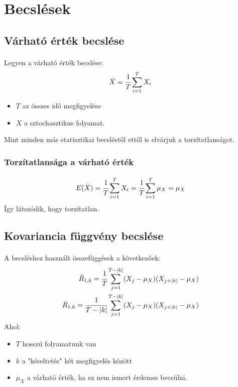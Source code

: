 \documentclass[11pt,a4paper]{article}
\begin{document}
		\section{Becslések}
			\subsection{Várható érték becslése}
				\paragraph{}
					Legyen a várható érték becslése:
					$$\bar{X} = \cfrac{1}{T} \sum_{i = 1}^{T}X_i$$
					\begin{itemize}
						\item $T$ az összes idő megfigyelése
						\item $X$ a sztochasztikus folyamat.
					\end{itemize}
					Mint minden más statisztikai becsléstől ettől is elvárjuk a torzítatlanságot.
				\subsubsection{Torzítatlansága a várható érték}
					\paragraph{}
						$$E(\bar{X}) = \cfrac{1}{T} \sum_{i = 1}^{T}X_i = \cfrac{1}{T} \sum_{i=1}^T \mu_X = \mu_X$$
						Így látszódik, hogy torzítatlan.
			\subsection{Kovariancia függvény becslése}
				\paragraph{}
					A becsléshez használt összefüggések a következőek:
					$$
					\begin{aligned}
						\hat{R}_{1,k} = \cfrac{1}{T}\sum_{j=1}^{T -|k|}(X_j - \mu_X)(X_{j+|k|} -\mu_X) \\
						\bar{R}_{1,k} = \cfrac{1}{T-|k|} \sum_{j=1}^{T - |k|}(X_j - \mu_X)(X_{j+ |k|} - \mu_X) 
					\end{aligned}$$
					Ahol:
					\begin{itemize}
						\item $T$ hosszú folyamatunk van
						\item $k$ a "késeltetés" két megfigyelés között
						\item $\mu_X$ a várható érték, ha ez nem ismert érdemes becsülni.
					\end{itemize}
\end{document}
